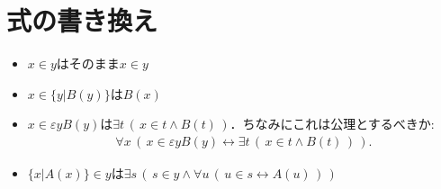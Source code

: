 \documentclass[a4j,10.5pt,oneside,openany]{jsbook}
\begin{document}
\section{式の書き換え}
	\begin{itemize}
		\item $x \in y$はそのまま$x \in y$
		\item $x \in \{y|B(y)\}$は$B(x)$
		\item $x \in \varepsilon y B(y)$は$\exists t\, \left(\, x \in t \wedge B(t)\, \right)$．ちなみにこれは公理とするべきか:
			\begin{align}
				\forall x\, \left(\, x \in \varepsilon y B(y) \leftrightarrow
				\exists t\, \left(\, x \in t \wedge B(t)\, \right)\, \right).
			\end{align}
			
		\item $\{x|A(x)\} \in y$は$\exists s\, \left(\, s \in y \wedge 
			\forall u\, \left(\, u \in s \leftrightarrow A(u)\, \right)\, \right)$
			

\end{itemize}
\end{document}
